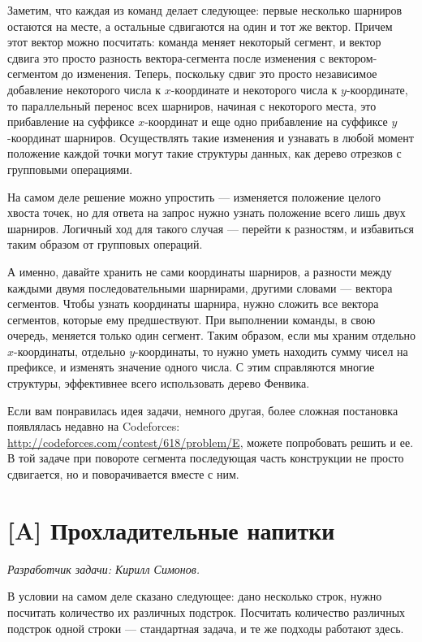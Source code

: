 \documentclass[12pt]{article}
\theoremstyle{definition}
\begin{document}
Заметим, что каждая из команд делает следующее: первые несколько шарниров остаются на месте,
а остальные сдвигаются на один и тот же вектор. Причем этот вектор можно посчитать:
команда меняет некоторый сегмент, и вектор сдвига это просто разность вектора-сегмента
после изменения с вектором-сегментом до изменения. Теперь, поскольку сдвиг это просто
независимое добавление некоторого числа к $x$-координате и некоторого числа к
$y$-координате, то параллельный перенос всех шарниров, начиная с некоторого места, это
прибавление на суффиксе $x$-координат и еще одно прибавление на суффиксе $y$-координат
шарниров. Осуществлять такие изменения и узнавать в любой момент положение каждой
точки могут такие структуры данных, как дерево отрезков с групповыми операциями.

На самом деле решение можно упростить --- изменяется положение целого хвоста точек, но
для ответа на запрос нужно узнать положение всего лишь двух шарниров. Логичный ход для
такого случая --- перейти к разностям, и избавиться таким образом от групповых операций.

А именно, давайте хранить не сами координаты шарниров, а разности между каждыми
двумя последовательными шарнирами, другими словами --- вектора сегментов. Чтобы
узнать координаты шарнира, нужно сложить все вектора сегментов, которые ему
предшествуют. При выполнении команды, в свою очередь, меняется только один сегмент.
Таким образом, если мы храним отдельно $x$-координаты, отдельно $y$-координаты, то
нужно уметь находить сумму чисел на префиксе, и изменять значение одного числа.
С этим справляются многие структуры, эффективнее всего использовать дерево Фенвика.

Если вам понравилась идея задачи, немного другая, более сложная постановка появлялась недавно на Codeforces:
\url{http://codeforces.com/contest/618/problem/E}, можете попробовать решить и ее.
В той задаче при повороте сегмента
последующая часть конструкции не просто сдвигается, но и поворачивается вместе с ним.

\pagebreak

\section{[A] Прохладительные напитки}
\textit{Разработчик задачи: Кирилл Симонов.}

В условии на самом деле сказано следующее: дано несколько строк, нужно посчитать
количество их различных подстрок. Посчитать количество различных подстрок одной строки
--- стандартная задача, и те же подходы работают здесь.
\end{document}
